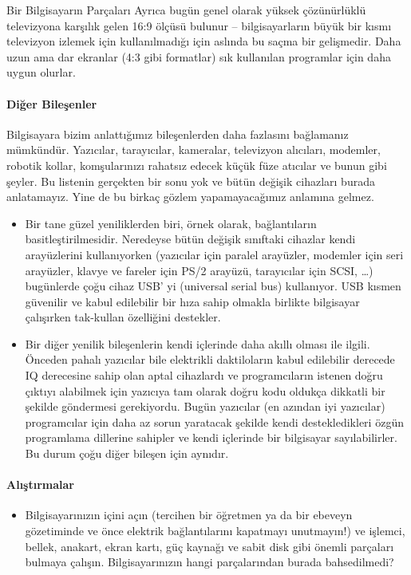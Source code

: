 \documentclass[10pt,a5paper]{book}
\begin{document}
\begin{section}{Bir Bilgisayarın Parçaları}
Ayrıca bugün genel olarak yüksek çözünürlüklü televizyona karşılık gelen 16:9 ölçüsü bulunur – bilgisayarların büyük bir kısmı televizyon izlemek için kullanılmadığı için aslında bu saçma bir gelişmedir. Daha uzun ama dar ekranlar (4:3 gibi formatlar) sık kullanılan programlar için daha uygun olurlar.
\paragraph{Diğer Bileşenler}{Bilgisayara bizim anlattığımız bileşenlerden daha fazlasını bağlamanız mümkündür. Yazıcılar, tarayıcılar, kameralar, televizyon alıcıları, modemler, robotik kollar, komşularınızı rahatsız edecek küçük füze atıcılar ve bunun gibi şeyler. Bu listenin gerçekten bir sonu yok ve bütün değişik cihazları burada anlatamayız. Yine de bu birkaç gözlem yapamayacağımız anlamına gelmez.}
\begin{itemize}
 \item Bir tane güzel yeniliklerden biri, örnek olarak, bağlantıların basitleştirilmesidir. Neredeyse bütün değişik sınıftaki cihazlar kendi arayüzlerini kullanıyorken (yazıcılar için paralel arayüzler, modemler için seri arayüzler, klavye ve fareler için PS/2 arayüzü, tarayıcılar için SCSI, …) bugünlerde çoğu cihaz USB' yi (universal serial bus) kullanıyor. USB kısmen güvenilir ve kabul edilebilir bir hıza sahip olmakla birlikte bilgisayar çalışırken tak-kullan özelliğini destekler.
 \item Bir diğer yenilik bileşenlerin kendi içlerinde daha akıllı olması ile ilgili. Önceden pahalı yazıcılar bile elektrikli daktiloların kabul edilebilir derecede IQ derecesine sahip olan aptal cihazlardı ve programcıların istenen doğru çıktıyı alabilmek için yazıcıya tam olarak doğru kodu oldukça dikkatli bir şekilde göndermesi gerekiyordu. Bugün yazıcılar (en azından iyi yazıcılar) programcılar için daha az sorun yaratacak şekilde kendi destekledikleri özgün programlama dillerine sahipler ve kendi içlerinde bir bilgisayar sayılabilirler. Bu durum çoğu diğer bileşen için aynıdır.
\end{itemize}
\paragraph{Alıştırmalar}{
\begin{itemize}
 \item Bilgisayarınızın içini açın (tercihen bir öğretmen ya da bir ebeveyn gözetiminde ve önce elektrik bağlantılarını kapatmayı unutmayın!) ve işlemci, bellek, anakart, ekran kartı, güç kaynağı ve sabit disk gibi önemli parçaları bulmaya çalışın. Bilgisayarınızın hangi parçalarından burada bahsedilmedi?
\end{itemize}}
\end{section}
\end{document}
